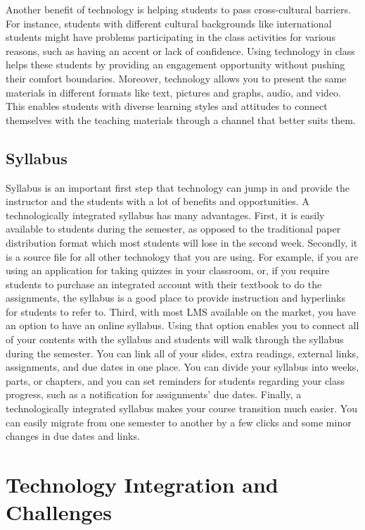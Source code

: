 \documentclass{book}
\begin{document}
Another benefit of technology is helping students to pass cross-cultural
barriers. For instance, students with different cultural backgrounds like
international students might have problems participating in the class
activities for various reasons, such as having an accent or lack of
confidence. Using technology in class helps these students by providing an
engagement opportunity without pushing their comfort boundaries. Moreover,
technology allows you to present the same materials in different formats like
text, pictures and graphs, audio, and video. This enables students with
diverse learning styles and attitudes to connect themselves with the teaching
materials through a channel that better suits them.

\hypertarget{syllabus}{%
\subsection{Syllabus}\label{syllabus}}

Syllabus is an important first step that technology can jump in and provide
the instructor and the students with a lot of benefits and opportunities. A
technologically integrated syllabus has many advantages. First, it is easily
available to students during the semester, as opposed to the traditional paper
distribution format which most students will lose in the second week.
Secondly, it is a source file for all other technology that you are using. For
example, if you are using an application for taking quizzes in your classroom,
or, if you require students to purchase an integrated account with their
textbook to do the assignments, the syllabus is a good place to provide
instruction and hyperlinks for students to refer to. Third, with most LMS
available on the market, you have an option to have an online syllabus. Using
that option enables you to connect all of your contents with the syllabus and
students will walk through the syllabus during the semester. You can link all
of your slides, extra readings, external links, assignments, and due dates in
one place. You can divide your syllabus into weeks, parts, or chapters, and
you can set reminders for students regarding your class progress, such as a
notification for assignments' due dates. Finally, a technologically integrated
syllabus makes your course transition much easier. You can easily migrate from
one semester to another by a few clicks and some minor changes in due dates
and links.

\hypertarget{technology-integration-and-challenges}{%
\section{Technology Integration and
Challenges}\label{technology-integration-and-challenges}}
\end{document}
